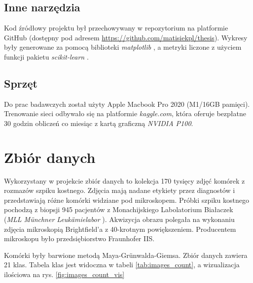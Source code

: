 \subsection{Inne narzędzia}

Kod źródłowy projektu był przechowywany w repozytorium na platformie GitHub (dostępny pod adresem \url{https://github.com/matisiekpl/thesis}).
Wykresy były generowane za pomocą biblioteki \textit{matplotlib} \cite{matplotlib},
a metryki liczone z użyciem funkcji pakietu \textit{scikit-learn} \cite{scikit_learn}.

\subsection{Sprzęt}

Do prac badawczych został użyty Apple Macbook Pro 2020 (M1/16GB pamięci). Trenowanie sieci odbywało się na platformie \textit{kaggle.com}, która oferuje bezpłatne 30 godzin obliczeń co miesiąc z kartą graficzną \textit{NVIDIA P100}.


\section{Zbiór danych}

Wykorzystany w projekcie zbiór danych to kolekcja 170 tysięcy zdjęć komórek z rozmazów szpiku kostnego.
Zdjęcia mają nadane etykiety przez diagnostów i przedstawiają różne komórki widziane pod mikroskopem.
Próbki szpiku kostnego pochodzą z biopsji 945 pacjentów z Monachijskiego Labolatorium Białaczek (\textit{MLL Münchner Leukämielabor} \cite{mll}).
Akwizycja obrazu polegała na wykonaniu zdjęcia mikroskopią Brightfield'a z 40-krotnym powiększeniem.
Producentem mikroskopu było przedsiębiorstwo Fraunhofer IIS.

Komórki były barwione metodą Maya-Grünwalda-Giemsa. Zbiór danych zawiera 21 klas. Tabela klas jest widoczna w tabeli \ref{tab:images_count},
a wizualizacja ilościowa na rys. \ref{fig:images_count_vis}

